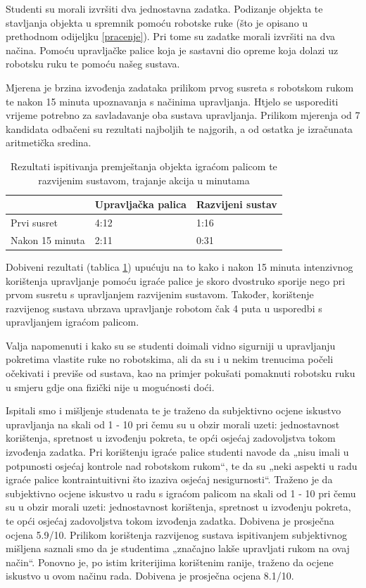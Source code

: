 \documentclass[times, utf8, diplomski, numeric]{fer}
\begin{document}
Studenti su morali izvršiti dva jednostavna zadatka. Podizanje objekta te stavljanja objekta u spremnik pomoću robotske ruke (što je opisano u prethodnom odijeljku \ref{pracenje}).
Pri tome su zadatke morali izvršiti na dva načina. Pomoću upravljačke palice koja je sastavni dio opreme koja dolazi uz robotsku ruku te pomoću našeg sustava.

Mjerena je brzina izvođenja zadataka prilikom prvog susreta s robotskom rukom te nakon 15 minuta upoznavanja s načinima upravljanja. Htjelo se usporediti vrijeme potrebno za savladavanje oba sustava upravljanja. Prilikom mjerenja od 7 kandidata odbačeni su rezultati najboljih te najgorih, a od ostatka je izračunata aritmetička sredina.


\begin{table}[h!]
    \centering
    \begin{tabular}{ | l | l | l |}
    \hline
     & Upravljačka palica&Razvijeni sustav\\ \hline
    Prvi susret & 4:12&1:16\\ \hline
    Nakon 15 minuta & 2:11&0:31\\ \hline
    \end{tabular}
    \caption{Rezultati ispitivanja premještanja objekta igraćom palicom te razvijenim sustavom, trajanje akcija u minutama} \label{ispitivanje-premjestanja}
\end{table}

Dobiveni rezultati (tablica \ref{ispitivanje-premjestanja}) upućuju na to kako i nakon 15 minuta intenzivnog korištenja upravljanje pomoću igraće palice je skoro dvostruko sporije nego pri prvom susretu s upravljanjem razvijenim sustavom. Također, korištenje razvijenog sustava ubrzava upravljanje robotom čak 4 puta u usporedbi s upravljanjem igraćom palicom.

Valja napomenuti i kako su se studenti doimali vidno sigurniji u upravljanju pokretima vlastite ruke no robotskima, ali da su i u nekim trenucima počeli očekivati i previše od sustava, kao na primjer pokušati pomaknuti robotsku ruku u smjeru gdje ona fizički nije u mogućnosti doći.

Ispitali smo i mišljenje studenata te je traženo da subjektivno ocjene iskustvo upravljanja na skali od 1 - 10 pri čemu su u obzir morali uzeti: jednostavnost korištenja, spretnost u izvođenju pokreta, te opći osjećaj zadovoljstva tokom izvođenja zadatka.
Pri korištenju igraće palice studenti navode da „nisu imali u potpunosti osjećaj kontrole nad robotskom rukom“, te da su „neki aspekti u radu igraće palice kontraintuitivni što izaziva osjećaj nesigurnosti“. Traženo je da subjektivno ocjene iskustvo u radu s igraćom palicom na skali od 1 - 10 pri čemu su u obzir morali uzeti: jednostavnost korištenja, spretnost u izvođenju pokreta, te opći osjećaj zadovoljstva tokom izvođenja zadatka. Dobivena je prosječna ocjena 5.9/10.
Prilikom korištenja razvijenog sustava ispitivanjem subjektivnog mišljena saznali smo da je studentima „značajno lakše upravljati rukom na ovaj način“. Ponovno je, po istim kriterijima korištenim ranije, traženo da ocjene iskustvo u ovom načinu rada. Dobivena je prosječna ocjena 8.1/10.
\end{document}
